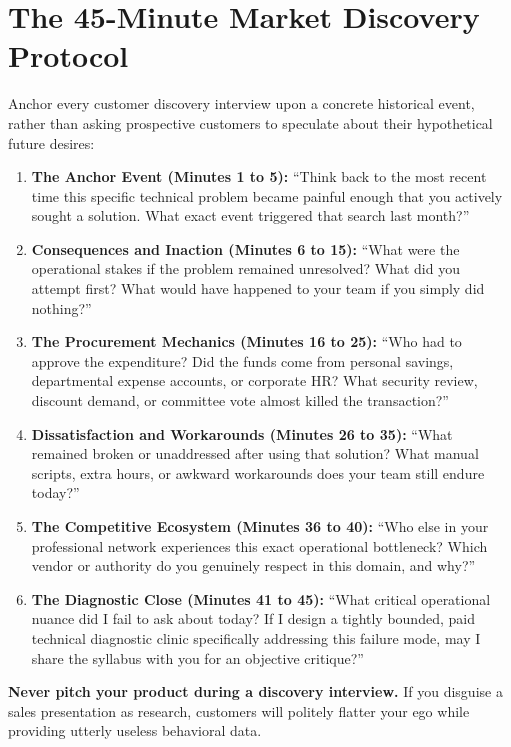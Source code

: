 \section{The 45-Minute Market Discovery Protocol}

Anchor every customer discovery interview upon a concrete historical event, rather than asking prospective customers to speculate about their hypothetical future desires:

\begin{enumerate}[leftmargin=14pt,itemsep=3pt,topsep=2pt]
  \item \textbf{The Anchor Event (Minutes 1 to 5):} ``Think back to the most recent time this specific technical problem became painful enough that you actively sought a solution. What exact event triggered that search last month?''
  \item \textbf{Consequences and Inaction (Minutes 6 to 15):} ``What were the operational stakes if the problem remained unresolved? What did you attempt first? What would have happened to your team if you simply did nothing?''
  \item \textbf{The Procurement Mechanics (Minutes 16 to 25):} ``Who had to approve the expenditure? Did the funds come from personal savings, departmental expense accounts, or corporate HR? What security review, discount demand, or committee vote almost killed the transaction?''
  \item \textbf{Dissatisfaction and Workarounds (Minutes 26 to 35):} ``What remained broken or unaddressed after using that solution? What manual scripts, extra hours, or awkward workarounds does your team still endure today?''
  \item \textbf{The Competitive Ecosystem (Minutes 36 to 40):} ``Who else in your professional network experiences this exact operational bottleneck? Which vendor or authority do you genuinely respect in this domain, and why?''
  \item \textbf{The Diagnostic Close (Minutes 41 to 45):} ``What critical operational nuance did I fail to ask about today? If I design a tightly bounded, paid technical diagnostic clinic specifically addressing this failure mode, may I share the syllabus with you for an objective critique?''
\end{enumerate}

\textbf{Never pitch your product during a discovery interview.} If you disguise a sales presentation as research, customers will politely flatter your ego while providing utterly useless behavioral data.

